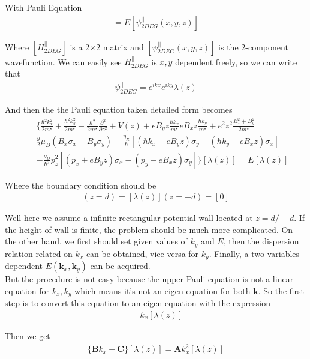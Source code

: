 With Pauli Equation
\begin{align*}
	[H^{||}_{2DEG}][\psi^{||}_{2DEG}(x,y,z)]=E[\psi^{||}_{2DEG}(x,y,z)]
\end{align*}

Where $[H^{||}_{2DEG}]$ is a 2$\times$2 matrix and $[\psi^{||}_{2DEG}(x,y,z)]$ is the 2-component wavefunction. We can easily see $H_{2DEG}^{||}$ is $x,y$ dependent freely, so we can write that
\begin{align*}
	\psi^{||}_{2DEG}=e^{ikx}e^{iky}\lambda(z)
\end{align*}


And then the the Pauli equation taken detailed form becomes
\begin{align}
	\nonumber &\Big\{\frac{\hbar^2k_x^2}{2m^\star}+\frac{\hbar^2k_y^2}{2m^\star}-\frac{\hbar^2}{2m^\star}\frac{\partial^2}{\partial z^2}+V(z)+eB_yz\frac{\hbar k_x}{m^\star}eB_xz\frac{\hbar k_y}{m^\star}+e^2z^2\frac{B_x^2+B_y^2}{2m^\star}\\-
	\nonumber &\frac{g}{2}\mu_B(B_x\sigma_x+B_y\sigma_y)-\frac{\eta_R}{\hbar}[(\hbar k_x+eB_yz)\sigma_y-(\hbar k_y-eB_xz)\sigma_x]\\
	&-\frac{\nu_D}{\hbar^3}p_z^2[(p_x+eB_yz)\sigma_x-(p_y-eB_xz)\sigma_y]\Big\}[\lambda(z)]=E[\lambda(z)]
\end{align}

Where the boundary condition should be 
\begin{align}
  [\lambda(z)](z=d)=[\lambda(z)](z=-d)=[0]
\end{align}

Well here we assume a infinite rectangular potential wall located at $z=d/-d$. If the height of wall is finite, the problem should be much more complicated. On the other hand, we first should set given values of $k_y$ and $E$, then the dispersion relation related on $k_x$ can be obtained, vice versa for $k_y$. Finally, a two variables dependent $E(\pmb{k}_x,\pmb{k}_y)$ can be acquired. \\

But the procedure is not easy because the upper Pauli equation is not a linear equation for $k_x, k_y$ which means it's not an eigen-equation for both $\pmb{k}$. So the first step is to convert this equation to an eigen-equation with the expression
\begin{align}
  [\varsigma(z)]=k_x[\lambda(z)]
\end{align}

Then we get 
\begin{align}
  \{\pmb{B}k_x+\pmb{C}\}[\lambda(z)]=\pmb{A}k_x^2[\lambda(z)]
\end{align}

